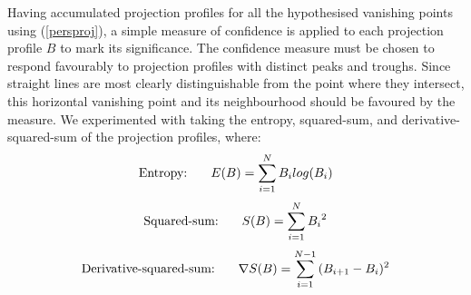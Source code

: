 



Having accumulated projection profiles for all the hypothesised vanishing points
using (\ref{persproj}), a simple measure of confidence is
applied to each projection profile $B$ to mark its significance.
The confidence measure must be chosen to respond favourably to projection profiles
with distinct peaks and troughs.
Since straight lines are most clearly distinguishable from the point where they
intersect, this horizontal vanishing point and its neighbourhood should be
favoured by the measure. We experimented with taking the entropy, squared-sum, and
derivative-squared-sum of the projection profiles, where:
\begin{equation} \mbox{Entropy: } \hspace*{5mm} E(B) = \sum_{i=1}^{N}{B_{i} log(B_{i})} \end{equation}
\begin{equation} \mbox{Squared-sum: } \hspace*{5mm} S(B) = \sum_{i=1}^{N}{{B_{i}}^{2}} \end{equation}
\begin{equation} \mbox{Derivative-squared-sum: } \hspace*{5mm} \nabla S(B) = \sum_{i=1}^{N-1}{{(B_{i+1}-B_{i}})^{2}} \end{equation}

